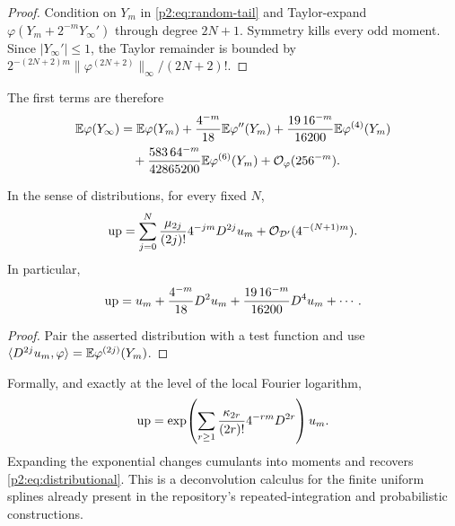 \documentclass[11pt,oneside]{article}
\numberwithin{equation}{section}
\theoremstyle{definition}
\theoremstyle{remark}
\newcommand{\bigO}{\mathcal O}
\begin{document}
\begin{proof}
Condition on $Y_m$ in \eqref{p2:eq:random-tail} and Taylor-expand
$\varphi(Y_m+2^{-m}Y_\infty')$ through degree $2N+1$.  Symmetry kills every odd moment.
Since $|Y_\infty'|\le1$, the Taylor remainder is bounded by
$2^{-(2N+2)m}\|\varphi^{(2N+2)}\|_\infty/(2N+2)!$.
\end{proof}

The first terms are therefore
\begin{align}
 \E\varphi(Y_\infty)
 &=\E\varphi(Y_m)
 +\frac{4^{-m}}{18}\E\varphi''(Y_m)
 +\frac{19\,16^{-m}}{16200}\E\varphi^{(4)}(Y_m)
 \notag\\
 &\quad
 +\frac{583\,64^{-m}}{42865200}\E\varphi^{(6)}(Y_m)
 +\bigO_\varphi(256^{-m}).
 \label{p2:eq:weak-first}
\end{align}

\begin{corollary}
\label{p2:cor:distributional}
In the sense of distributions, for every fixed $N$,
\begin{equation}
 \Up
 =\sum_{j=0}^{N}\frac{\mu_{2j}}{(2j)!}4^{-jm}D^{2j}u_m
 +\bigO_{\mathcal D'}(4^{-(N+1)m}).
 \label{p2:eq:distributional}
\end{equation}
In particular,
\begin{equation}
 \operatorname{up}=u_m+\frac{4^{-m}}{18}D^2u_m
 +\frac{19\,16^{-m}}{16200}D^4u_m+\cdots.
 \label{p2:eq:distributional-first}
\end{equation}
\end{corollary}

\begin{proof}
Pair the asserted distribution with a test function and use
$\langle D^{2j}u_m,\varphi\rangle=\mathbb E\varphi^{(2j)}(Y_m)$.
\end{proof}

\begin{remark}
Formally, and exactly at the level of the local Fourier logarithm,
\begin{equation}
 \operatorname{up}=\exp\!\left(\sum_{r\ge1}
 \frac{\kappa_{2r}}{(2r)!}4^{-rm}D^{2r}\right)u_m.
 \label{p2:eq:cumulant-operator}
\end{equation}
Expanding the exponential changes cumulants into moments and recovers
\eqref{p2:eq:distributional}.  This is a deconvolution calculus for the finite uniform splines
already present in the repository's repeated-integration and probabilistic constructions.
\end{remark}
\end{document}
